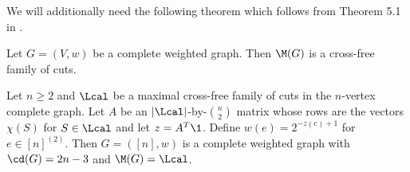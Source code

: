 We will additionally need the following theorem which follows from Theorem 5.1 in \cite{CR04}.
\begin{theorem}[\cite{CR04}]
\label{thm:cr_complete}
Let $G = (V,w)$ be a complete weighted graph.  Then $\M(G)$ is a cross-free family of cuts.
\end{theorem}


\begin{theorem}
\label{thm:explicit}
Let $n \ge 2$ and $\Lcal$ be a {maximal} cross-free family of cuts in the $n$-vertex complete graph.  Let
$A$ be an $|\Lcal|$-by-$\binom{n}{2}$ matrix whose rows are the vectors $\chi(S)$ for $S \in \Lcal$ and
let $z = A^T \1$.  Define $w(e) = 2^{-z(e)+1}$ for $e \in [n]^{(2)}$.
Then $G=([n],w)$ is a complete weighted graph with $\cd(G) = 2n-3$ and $\M(G) = \Lcal$.
\end{theorem}

